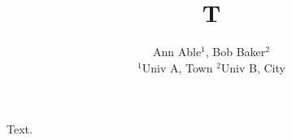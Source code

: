 \documentclass{article}
\begin{document}
\title{T}
\author{Ann Able$^{1}$, Bob Baker$^{2}$ \\ {$^{1}$Univ A, Town\break
$^{2}$Univ B, City}}
\date{}
\maketitle
Text.
\end{document}
